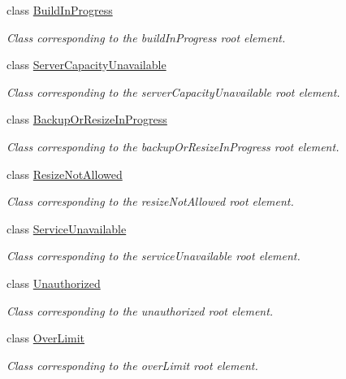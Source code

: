 \begin{DoxyCompactItemize}
class \hyperlink{classopenstack_1_1xml_1_1BuildInProgress}{BuildInProgress}
\begin{DoxyCompactList}\small\item\em Class corresponding to the buildInProgress root element. \item\end{DoxyCompactList}\item 
class \hyperlink{classopenstack_1_1xml_1_1ServerCapacityUnavailable}{ServerCapacityUnavailable}
\begin{DoxyCompactList}\small\item\em Class corresponding to the serverCapacityUnavailable root element. \item\end{DoxyCompactList}\item 
class \hyperlink{classopenstack_1_1xml_1_1BackupOrResizeInProgress}{BackupOrResizeInProgress}
\begin{DoxyCompactList}\small\item\em Class corresponding to the backupOrResizeInProgress root element. \item\end{DoxyCompactList}\item 
class \hyperlink{classopenstack_1_1xml_1_1ResizeNotAllowed}{ResizeNotAllowed}
\begin{DoxyCompactList}\small\item\em Class corresponding to the resizeNotAllowed root element. \item\end{DoxyCompactList}\item 
class \hyperlink{classopenstack_1_1xml_1_1ServiceUnavailable}{ServiceUnavailable}
\begin{DoxyCompactList}\small\item\em Class corresponding to the serviceUnavailable root element. \item\end{DoxyCompactList}\item 
class \hyperlink{classopenstack_1_1xml_1_1Unauthorized}{Unauthorized}
\begin{DoxyCompactList}\small\item\em Class corresponding to the unauthorized root element. \item\end{DoxyCompactList}\item 
class \hyperlink{classopenstack_1_1xml_1_1OverLimit}{OverLimit}
\begin{DoxyCompactList}\small\item\em Class corresponding to the overLimit root element. \item\end{DoxyCompactList}\item 

\end{DoxyCompactItemize}
